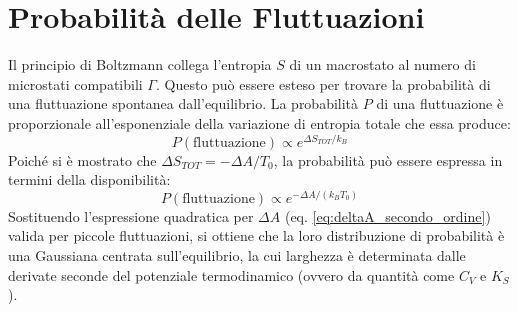 \section{Probabilità delle Fluttuazioni}

Il principio di Boltzmann collega l'entropia $S$ di un macrostato al numero di microstati compatibili $\Gamma$. Questo può essere esteso per trovare la probabilità di una fluttuazione spontanea dall'equilibrio. La probabilità $P$ di una fluttuazione è proporzionale all'esponenziale della variazione di entropia totale che essa produce:
\begin{equation}
    P(\text{fluttuazione}) \propto e^{\Delta S_{TOT} / k_B}
\end{equation}
Poiché si è mostrato che $\Delta S_{TOT} = -\Delta A / T_0$, la probabilità può essere espressa in termini della disponibilità:
\begin{equation}
    P(\text{fluttuazione}) \propto e^{-\Delta A / (k_B T_0)}
    \label{eq:prob_fluttuazione_A}
\end{equation}
Sostituendo l'espressione quadratica per $\Delta A$ (eq. \eqref{eq:deltaA_secondo_ordine}) valida per piccole fluttuazioni, si ottiene che la loro distribuzione di probabilità è una Gaussiana centrata sull'equilibrio, la cui larghezza è determinata dalle derivate seconde del potenziale termodinamico (ovvero da quantità come $C_V$ e $K_S$).
